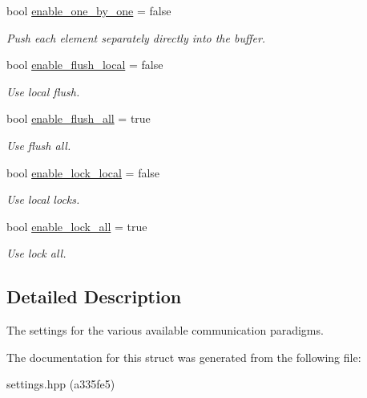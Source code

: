 \begin{DoxyCompactItemize}
bool \hyperlink{structschwz_1_1Settings_1_1comm__settings_aae063b9fcf2bc8e49e960286e4c0939f}{enable\+\_\+one\+\_\+by\+\_\+one} = false
\begin{DoxyCompactList}\small\item\em Push each element separately directly into the buffer. \end{DoxyCompactList}\item 
\mbox{\label{structschwz_1_1Settings_1_1comm__settings_a5bea917e0dc11a5a671bd4d8cdb3e3cf}} 
bool \hyperlink{structschwz_1_1Settings_1_1comm__settings_a5bea917e0dc11a5a671bd4d8cdb3e3cf}{enable\+\_\+flush\+\_\+local} = false
\begin{DoxyCompactList}\small\item\em Use local flush. \end{DoxyCompactList}\item 
\mbox{\label{structschwz_1_1Settings_1_1comm__settings_a3eb62d22f79472020fce577ceddad916}} 
bool \hyperlink{structschwz_1_1Settings_1_1comm__settings_a3eb62d22f79472020fce577ceddad916}{enable\+\_\+flush\+\_\+all} = true
\begin{DoxyCompactList}\small\item\em Use flush all. \end{DoxyCompactList}\item 
\mbox{\label{structschwz_1_1Settings_1_1comm__settings_abc715396bf51f36307caf88db02c819c}} 
bool \hyperlink{structschwz_1_1Settings_1_1comm__settings_abc715396bf51f36307caf88db02c819c}{enable\+\_\+lock\+\_\+local} = false
\begin{DoxyCompactList}\small\item\em Use local locks. \end{DoxyCompactList}\item 
\mbox{\label{structschwz_1_1Settings_1_1comm__settings_a39a59cea325ea1b57aba12e9ada4b91b}} 
bool \hyperlink{structschwz_1_1Settings_1_1comm__settings_a39a59cea325ea1b57aba12e9ada4b91b}{enable\+\_\+lock\+\_\+all} = true
\begin{DoxyCompactList}\small\item\em Use lock all. \end{DoxyCompactList}\end{DoxyCompactItemize}


\subsection{Detailed Description}
The settings for the various available communication paradigms. 

The documentation for this struct was generated from the following file\+:\begin{DoxyCompactItemize}
\item 
settings.\+hpp (a335fe5)\end{DoxyCompactItemize}
